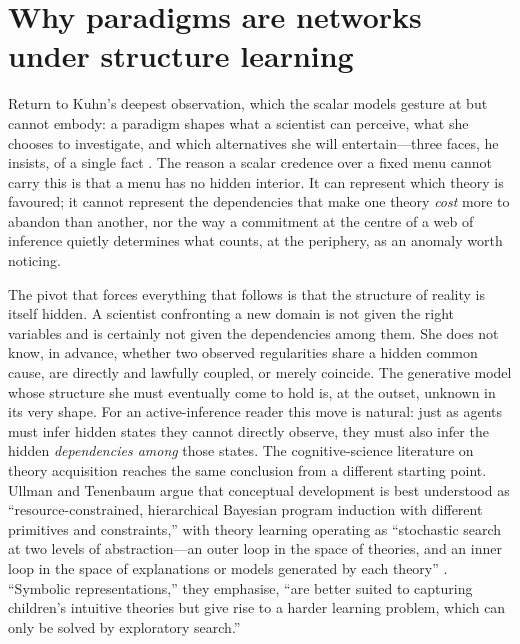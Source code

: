 \section{Why paradigms are networks under structure learning}
\label{sec:hidden}

Return to Kuhn's deepest observation, which the scalar models gesture at but
cannot embody: a paradigm shapes what a scientist can perceive, what she
chooses to investigate, and which alternatives she will entertain---three
faces, he insists, of a single fact \citep{kuhn1962}. The reason a scalar
credence over a fixed menu cannot carry this is that a menu has no hidden
interior. It can represent which theory is favoured; it cannot represent the
dependencies that make one theory \emph{cost} more to abandon than another,
nor the way a commitment at the centre of a web of inference quietly
determines what counts, at the periphery, as an anomaly worth noticing.

The pivot that forces everything that follows is that the structure of
reality is itself hidden. A scientist confronting a new domain is not given
the right variables and is certainly not given the dependencies among them.
She does not know, in advance, whether two observed regularities share a
hidden common cause, are directly and lawfully coupled, or merely coincide.
The generative model whose structure she must eventually come to hold is, at
the outset, unknown in its very shape. For an active-inference reader this
move is natural: just as agents must infer hidden states they cannot directly
observe, they must also infer the hidden \emph{dependencies among} those
states. The cognitive-science literature on theory acquisition reaches the
same conclusion from a different starting point. Ullman and Tenenbaum
\citep{ullman2020} argue that conceptual development is best understood as
``resource-constrained, hierarchical Bayesian program induction with
different primitives and constraints,'' with theory learning operating as
``stochastic search at two levels of abstraction---an outer loop in the space
of theories, and an inner loop in the space of explanations or models
generated by each theory'' \citep{kemp2008form,ullmangoodman2012}.
``Symbolic representations,'' they emphasise, ``are better suited to
capturing children's intuitive theories but give rise to a harder learning
problem, which can only be solved by exploratory search.''

